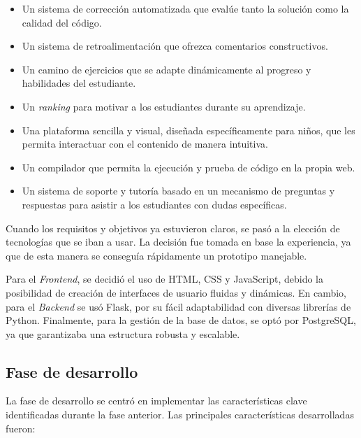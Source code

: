 \begin{itemize}
    \item Un sistema de corrección automatizada que evalúe tanto la solución como la calidad del código.
    \item Un sistema de retroalimentación que ofrezca comentarios constructivos.
    \item Un camino de ejercicios que se adapte dinámicamente al progreso y habilidades del estudiante.
    \item Un \textit{ranking} para motivar a los estudiantes durante su aprendizaje.
    \item Una plataforma sencilla y visual, diseñada específicamente para niños, que les permita interactuar con el contenido de manera intuitiva.
    \item Un compilador que permita la ejecución y prueba de código en la propia web.
    \item Un sistema de soporte y tutoría basado en un mecanismo de preguntas y respuestas para asistir a los estudiantes con dudas específicas.
\end{itemize}

Cuando los requisitos y objetivos ya estuvieron claros, se pasó a la elección de tecnologías que se iban a usar. La decisión fue tomada en base la experiencia, ya que de esta manera se conseguía rápidamente un prototipo manejable. 

Para el \textit{Frontend}, se decidió el uso de HTML, CSS y JavaScript, debido la posibilidad de creación de interfaces de usuario fluidas y dinámicas. En cambio, para el \textit{Backend} se usó Flask, por su fácil adaptabilidad con diversas librerías de Python. Finalmente, para la gestión de la base de datos, se optó por PostgreSQL, ya que garantizaba una estructura robusta y escalable.

\subsection {Fase de desarrollo}

La fase de desarrollo se centró en implementar las características clave identificadas durante la fase anterior. Las principales características desarrolladas fueron:

